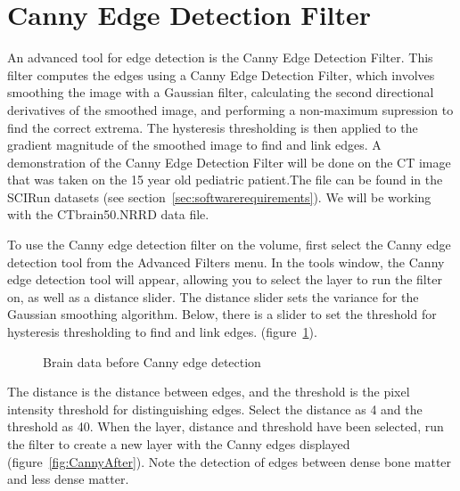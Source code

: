 \documentclass[fleqn,11pt,openany]{book}
\begin{document}
\section{Canny Edge Detection Filter}
An advanced tool for edge detection is the Canny Edge Detection Filter. This filter computes the edges using a Canny Edge Detection Filter, which involves smoothing the image with a Gaussian filter, calculating the second directional derivatives of the smoothed image, and performing a non-maximum supression to find the correct extrema. The hysteresis thresholding is then applied to the gradient magnitude of the smoothed image to find and link edges. A demonstration of the Canny Edge Detection Filter will be done on the CT image that was taken on the 15 year old pediatric patient.The file can be found in the SCIRun datasets (see section~\ref{sec:softwarerequirements}). We will be working with the CTbrain50.NRRD data file.

To use the Canny edge detection filter on the volume, first select the Canny edge detection tool from the Advanced Filters menu. In the tools window, the Canny edge detection tool will appear, allowing you to select the layer to run the filter on, as well as a distance slider. The distance slider sets the variance for the Gaussian smoothing algorithm. Below, there is a slider to set the threshold for hysteresis thresholding to find and link edges. (figure~\ref{fig:CannyBefore}). 

\begin{figure}
\caption{Brain data before Canny edge detection}\label{fig:CannyBefore}
\end{figure}

The distance is the distance between edges, and the threshold is the pixel intensity threshold for distinguishing edges. Select the distance as 4 and the threshold as 40. When the layer, distance and threshold have been selected, run the filter to create a new layer with the Canny edges displayed (figure~\ref{fig:CannyAfter}). Note the detection of edges between dense bone matter and less dense matter.
\end{document}
